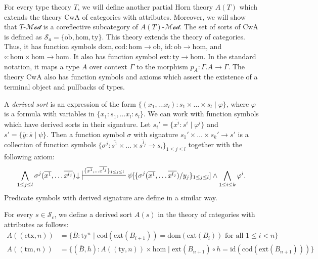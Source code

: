 \documentclass[reqno]{amsart}
\theoremstyle{definition}
\theoremstyle{remark}
\newcommand{\fs}[1]{\mathrm{#1}}
\newcommand{\cat}[1]{\mathcal{#1}}
\newcommand{\Mod}[1]{#1\text{-}\cat{Mod}}
\numberwithin{figure}{section}
\begin{document}
For every type theory $T$, we will define another partial Horn theory $A(T)$ which extends the theory $\fs{CwA}$ of categories with attributes.
Moreover, we will show that $\Mod{T}$ is a coreflective subcategory of $\Mod{A(T)}$.
The set of sorts of $\fs{CwA}$ is defined as $\mathcal{S}_a = \{ \fs{ob}, \fs{hom}, \fs{ty} \}$.
This theory extends the theory of categories.
Thus, it has function symbols $\fs{dom},\fs{cod} : \fs{hom} \to \fs{ob}$, $\fs{id} : \fs{ob} \to \fs{hom}$, and $\circ : \fs{hom} \times \fs{hom} \to \fs{hom}$.
It also has function symbol $\fs{ext} : \fs{ty} \to \fs{hom}$.
In the standard notation, it maps a type $A$ over context $\Gamma$ to the morphism $p_A : \Gamma.A \to \Gamma$.
The theory $\fs{CwA}$ also has function symbols and axioms which assert the existence of a terminal object and pullbacks of types.

A \emph{derived sort} is an expression of the form $\{ (x_1, \ldots x_l) : s_1 \times \ldots \times s_l \mid \varphi \}$,
where $\varphi$ is a formula with variables in $\{ x_1 : s_1, \ldots x_l : s_l \}$.
We can work with function symbols which have derived sorts in their signature.
Let $s_i' = \{ \overline{x^i} : \overline{s^i} \mid \varphi^i \}$ and $s' = \{ \overline{y} : \overline{s} \mid \psi \}$.
Then a function symbol $\sigma$ with signature $s_1' \times \ldots \times s_k' \to s'$ is a collection of function symbols
$\{ \sigma^j : \overline{s^1} \times \ldots \times \overline{s^{l_j}} \to s_i \}_{1 \leq j \leq l}$ together with the following axiom:
\[ \bigwedge_{1 \leq j \leq l} \sigma^j(\overline{x^1}, \ldots \overline{x^{l_j}})\!\downarrow\ \sststile{}{\{ \overline{x^1}, \ldots \overline{x^{l_j}} \}_{1 \leq j \leq l}} \psi[\{ \sigma^j(\overline{x^1}, \ldots \overline{x^{l_j}})/y_j \}_{1 \leq j \leq l}] \land \bigwedge_{1 \leq i \leq k} \varphi^i. \]
Predicate symbols with derived signature are define in a similar way.

For every $s \in \mathcal{S}_c$, we define a derived sort $A(s)$ in the theory of categories with attributes as follows:
\begin{align*}
A((\fs{ctx},n)) & = \{ \overline{B} : \fs{ty}^n \mid \fs{cod}(\fs{ext}(B_{i+1})) = \fs{dom}(\fs{ext}(B_i)) \text{ for all } 1 \leq i < n \} \\
A((\fs{tm},n)) & = \{ (\overline{B}, h) : A((\fs{ty},n)) \times \fs{hom} \mid \fs{ext}(B_{n+1}) \circ h = \fs{id}(\fs{cod}(\fs{ext}(B_{n+1}))) \}
\end{align*}
\end{document}
